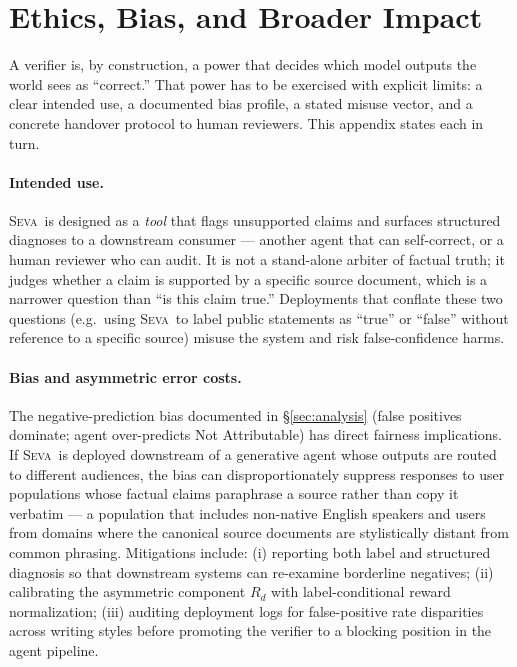 \documentclass{article}
\newcommand{\seva}{\textsc{Seva}\xspace}
\begin{document}
\section{Ethics, Bias, and Broader Impact}
\label{app:ethics}

A verifier is, by construction, a power that decides which model outputs the world sees as ``correct.''
That power has to be exercised with explicit limits: a clear intended use, a documented bias profile, a stated misuse vector, and a concrete handover protocol to human reviewers.
This appendix states each in turn.

\paragraph{Intended use.}
\seva\ is designed as a \emph{tool} that flags unsupported claims and surfaces structured diagnoses to a downstream consumer --- another agent that can self-correct, or a human reviewer who can audit.
It is not a stand-alone arbiter of factual truth; it judges whether a claim is supported by a specific source document, which is a narrower question than ``is this claim true.''
Deployments that conflate these two questions (e.g.\ using \seva\ to label public statements as ``true'' or ``false'' without reference to a specific source) misuse the system and risk false-confidence harms.

\paragraph{Bias and asymmetric error costs.}
The negative-prediction bias documented in \S\ref{sec:analysis} (false positives dominate; agent over-predicts Not Attributable) has direct fairness implications.
If \seva\ is deployed downstream of a generative agent whose outputs are routed to different audiences, the bias can disproportionately suppress responses to user populations whose factual claims paraphrase a source rather than copy it verbatim --- a population that includes non-native English speakers and users from domains where the canonical source documents are stylistically distant from common phrasing.
Mitigations include: (i) reporting both label and structured diagnosis so that downstream systems can re-examine borderline negatives; (ii) calibrating the asymmetric component $R_d$ with label-conditional reward normalization; (iii) auditing deployment logs for false-positive rate disparities across writing styles before promoting the verifier to a blocking position in the agent pipeline.
\end{document}
